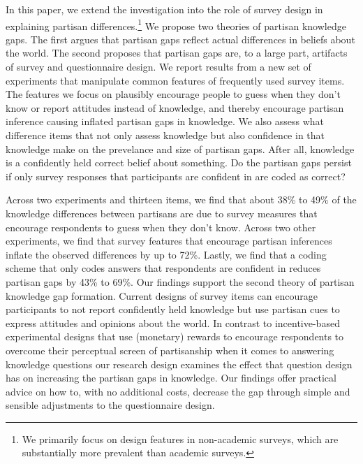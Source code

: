 \documentclass[12pt, letterpaper]{article}
\begin{document}
In this paper, we extend the investigation into the role of survey design in explaining partisan differences.\footnote{We primarily focus on design features in non-academic surveys, which are substantially more prevalent than academic surveys.} We propose two theories of partisan knowledge gaps. The first argues that partisan gaps reflect actual differences in beliefs about the world. The second proposes that partisan gaps are, to a large part, artifacts of survey and questionnaire design. We report results from a new set of experiments that manipulate common features of frequently used survey items. The features we focus on plausibly encourage people to guess when they don't know or report attitudes instead of knowledge, and thereby encourage partisan inference causing inflated partisan gaps in knowledge. We also assess what difference items that not only assess knowledge but also confidence in that knowledge make on the prevelance and size of partisan gaps. After all, knowledge is a confidently held correct belief about something. Do the partisan gaps persist if only survey responses that participants are confident in are coded as correct?

Across two experiments and thirteen items, we find that about 38\% to 49\% of the knowledge differences between partisans are due to survey measures that encourage respondents to guess when they don't know. Across two other experiments, we find that survey features that encourage partisan inferences inflate the observed differences by up to 72\%. Lastly, we find that a coding scheme that only codes answers that respondents are confident in reduces partisan gaps by 43\% to 69\%. Our findings support the second theory of partisan knowledge gap formation. Current designs of survey items can encourage participants to not report confidently held knowledge but use partisan cues to express attitudes and opinions about the world. In contrast to incentive-based experimental designs that use (monetary) rewards to encourage respondents to overcome their perceptual screen of partisanship when it comes to answering knowledge questions \citep[for example, see][]{bullocketal_2015, peterson2021partisan} our research design examines the effect that question design has on increasing the partisan gaps in knowledge. Our findings offer practical advice on how to, with no additional costs, decrease the gap through simple and sensible adjustments to the questionnaire design.
\end{document}
